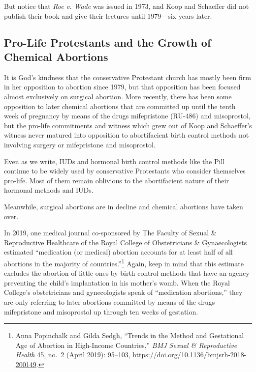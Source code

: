 \documentclass[
]{book}
\begin{document}
But notice that \emph{Roe v. Wade} was issued in 1973, and Koop and Schaeffer did not publish their book and give their lectures until 1979---six years later.

\hypertarget{pro-life-protestants-and-the-growth-of-chemical-abortions}{%
\subsection{Pro-Life Protestants and the Growth of Chemical Abortions}\label{pro-life-protestants-and-the-growth-of-chemical-abortions}}

It is God's kindness that the conservative Protestant church has mostly been firm in her opposition to abortion since 1979, but that opposition has been focused almost exclusively on surgical abortion. More recently, there has been some opposition to later chemical abortions that are committed up until the tenth week of pregnancy by means of the drugs mifepristone (RU-486) and misoprostol, but the pro-life commitments and witness which grew out of Koop and Schaeffer's witness never matured into opposition to abortifacient birth control methods not involving surgery or mifepristone and misoprostol.

Even as we write, IUDs and hormonal birth control methods like the Pill continue to be widely used by conservative Protestants who consider themselves pro-life. Most of them remain oblivious to the abortifacient nature of their hormonal methods and IUDs.

Meanwhile, surgical abortions are in decline and chemical abortions have taken over.

In 2019, one medical journal co-sponsored by The Faculty of Sexual \& Reproductive Healthcare of the Royal College of Obstetricians \& Gynaecologists estimated ``medication (or medical) abortion accounts for at least half of all abortions in the majority of countries.''\footnote{Anna Popinchalk and Gilda Sedgh, ``Trends in the Method and Gestational Age of Abortion in High-Income Countries,'' \emph{BMJ Sexual \& Reproductive Health} 45, no.~2 (April 2019): 95--103, \url{https://doi.org/10.1136/bmjsrh-2018-200149}.} Again, keep in mind that this estimate excludes the abortion of little ones by birth control methods that have an agency preventing the child's implantation in his mother's womb. When the Royal College's obstetricians and gynecologists speak of ``medication abortions,'' they are only referring to later abortions committed by means of the drugs mifepristone and misoprostol up through ten weeks of gestation.
\end{document}
